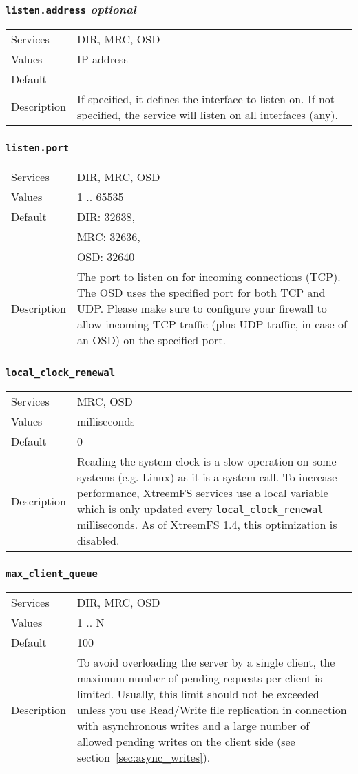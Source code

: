 \documentclass[a4paper,10pt]{book}
\begin{document}
\subsubsection{\texttt{listen.address} \textit{optional}}
\begin{tabular}{lp{10cm}}
 Services & DIR, MRC, OSD\\
 Values   & IP address \\
 Default  & \\
 Description & If specified, it defines the interface to listen on. If not specified, the service will listen on all interfaces (any).
\end{tabular}

\subsubsection{\texttt{listen.port}}
\begin{tabular}{lp{10cm}}
 Services & DIR, MRC, OSD\\
 Values   & 1 .. 65535 \\
 Default  & DIR: 32638,\\
 & MRC: 32636,\\
 & OSD: 32640 \\
 Description & The port to listen on for incoming connections (TCP). The OSD uses the specified port for both TCP and UDP. Please make sure to configure your firewall to allow incoming TCP traffic (plus UDP traffic, in case of an OSD) on the specified port.
\end{tabular}

\subsubsection{\texttt{local\_clock\_renewal}}
\begin{tabular}{lp{10cm}}
 Services & MRC, OSD\\
 Values   & milliseconds \\
 Default  & 0\\
 Description & Reading the system clock is a slow operation on some systems (e.g. Linux) as it is a system call. To increase performance, XtreemFS services use a local variable which is only updated every \texttt{local\_clock\_renewal} milliseconds. As of XtreemFS 1.4, this optimization is disabled.
\end{tabular}

\subsubsection{\texttt{max\_client\_queue}}
\begin{tabular}{lp{10cm}}
 Services & DIR, MRC, OSD\\
 Values   & 1 .. N\\
 Default  & 100\\
 Description & To avoid overloading the server by a single client, the maximum number of pending requests per client is limited. Usually, this limit should not be exceeded unless you use Read/Write file replication in connection with asynchronous writes and a large number of allowed pending writes on the client side (see section~\ref{sec:async_writes}).
\end{tabular}
\end{document}
